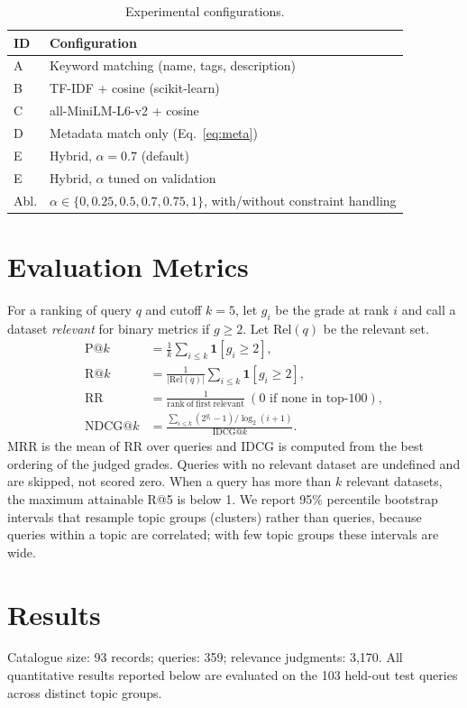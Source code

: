 \documentclass[conference]{IEEEtran}
\begin{document}
\begin{table}[t]
\centering
\caption{Experimental configurations.}
\label{tab:config}
\scriptsize
\begin{tabular}{lp{6.4cm}}
\toprule
ID & Configuration \\
\midrule
A & Keyword matching (name, tags, description) \\
B & TF-IDF + cosine (scikit-learn) \\
C & all-MiniLM-L6-v2 + cosine \\
D & Metadata match only (Eq.~\ref{eq:meta}) \\
E & Hybrid, $\alpha=0.7$ (default) \\
E & Hybrid, $\alpha$ tuned on validation \\
Abl. & $\alpha\in\{0,0.25,0.5,0.7,0.75,1\}$, with/without constraint handling \\
\bottomrule
\end{tabular}
\end{table}

\section{Evaluation Metrics}
For a ranking of query $q$ and cutoff $k=5$, let $g_i$ be the grade at rank $i$ and call a dataset \emph{relevant} for binary metrics if $g\ge 2$. Let $\mathrm{Rel}(q)$ be the relevant set.
\begin{align}
\mathrm{P@}k&=\tfrac{1}{k}\textstyle\sum_{i\le k}\mathbf{1}[g_i\ge2],\\
\mathrm{R@}k&=\tfrac{1}{|\mathrm{Rel}(q)|}\textstyle\sum_{i\le k}\mathbf{1}[g_i\ge2],\\
\mathrm{RR}&=\tfrac{1}{\mathrm{rank\ of\ first\ relevant}}\ (0\text{ if none in top-100}),\\
\mathrm{NDCG@}k&=\frac{\sum_{i\le k}(2^{g_i}-1)/\log_2(i+1)}{\mathrm{IDCG@}k}.
\end{align}
MRR is the mean of RR over queries and IDCG is computed from the best ordering of the judged grades. Queries with no relevant dataset are undefined and are skipped, not scored zero. When a query has more than $k$ relevant datasets, the maximum attainable R@5 is below 1. We report 95\% percentile bootstrap intervals that resample topic groups (clusters) rather than queries, because queries within a topic are correlated; with few topic groups these intervals are wide.

\section{Results}
Catalogue size: 93 records; queries: 359; relevance judgments: 3,170. All quantitative results reported below are evaluated on the 103 held-out test queries across distinct topic groups.
\end{document}

